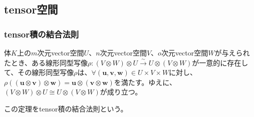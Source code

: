 \documentclass[dvipdfmx]{jsarticle}
\begin{document}
\subsection{tensor空間}%
\subsubsection{tensor積の結合法則}%
\begin{thm}[tensor積の結合法則]\label{2.4.6.1}
体$K$上の$m$次元vector空間$U$、$n$次元vector空間$V$、$o$次元vector空間$W$が与えられたとき、ある線形同型写像$\rho:(V \otimes W) \otimes U\overset{\sim}{\rightarrow}U \otimes (V \otimes W)$が一意的に存在して、その線形同型写像$\rho$は、$\forall\left( \mathbf{u},\mathbf{v},\mathbf{w} \right) \in U \times V \times W$に対し、$\rho\left( \left( \mathbf{u} \otimes \mathbf{v} \right) \otimes \mathbf{w} \right) = \mathbf{u} \otimes \left( \mathbf{v} \otimes \mathbf{w} \right)$を満たす。ゆえに、$(V \otimes W) \otimes U \cong U \otimes (V \otimes W)$が成り立つ。\par
この定理をtensor積の結合法則という。
\end{thm}
\end{document}
